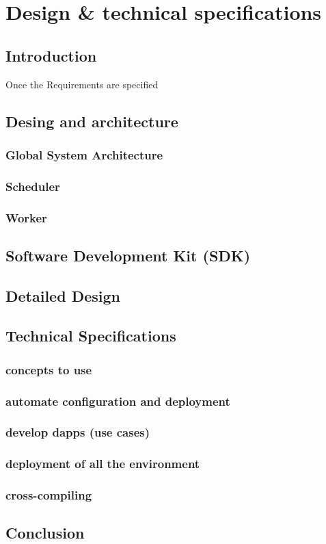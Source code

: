 

\chapter{Design \& technical specifications}


\section{Introduction}
    Once the Requirements are specified

\section{Desing and architecture}
    \subsection{Global System Architecture}
    \subsection{Scheduler}
    \subsection{Worker}

\section{Software Development Kit (SDK)}


\section{Detailed Design}


\section{Technical Specifications}
    \subsection{concepts to use}
    \subsection{automate configuration and deployment}
    \subsection{develop dapps (use cases)}
    \subsection{deployment of all the environment}
    \subsection{cross-compiling}


\section{Conclusion}